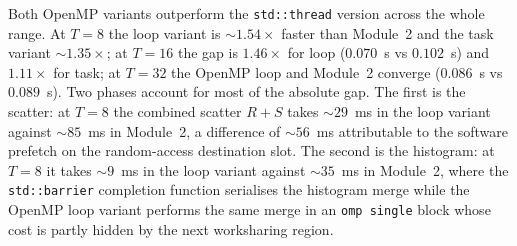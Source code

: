 \documentclass[10pt,twocolumn,a4paper]{article}
\begin{document}
\begin{table}[t]
\centering\small
\setlength{\tabcolsep}{3pt}
\caption{Module 2 \texttt{std::thread} vs Module 3 OpenMP, uniform
$N_R{=}10^7$, $N_S{=}2{\cdot}10^7$, both runs on the same
E5-2640~v2 SLURM allocation. The first row is the shared sequential
baseline ($0.802$~s, current \texttt{hashjoin\_seq} mean of 3 runs);
the speedup columns are $T_{\text{seq}}/T(p)$. The optimisations of
Section~\ref{sec:opt} apply to Module~3 only.}
\label{tab:m2}
\end{table}

Both OpenMP variants outperform the \texttt{std::thread} version
across the whole range. At $T{=}8$ the loop variant is
$\sim 1.54\times$ faster than Module~2 and the task variant
$\sim 1.35\times$; at $T{=}16$ the gap is $1.46\times$ for loop
($0.070$~s vs $0.102$~s) and $1.11\times$ for task; at $T{=}32$
the OpenMP loop and Module~2 converge ($0.086$~s vs $0.089$~s).
Two phases
account for most of the absolute gap. The first is the scatter: at
$T{=}8$ the combined scatter $R{+}S$ takes $\sim 29$~ms in the loop
variant against $\sim 85$~ms in Module~2, a difference of
$\sim 56$~ms attributable to the software prefetch on the
random-access destination slot. The second is the histogram: at
$T{=}8$ it takes $\sim 9$~ms in the loop variant against
$\sim 35$~ms in Module~2, where the \texttt{std::barrier}
completion function serialises the histogram merge while the OpenMP
loop variant performs the same merge in an \texttt{omp single} block
whose cost is partly hidden by the next worksharing region.
\end{document}
